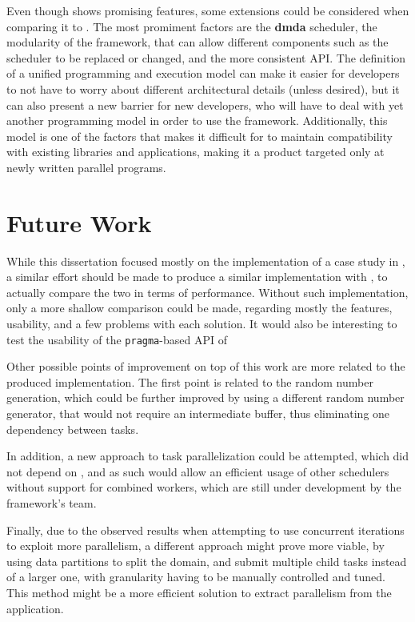 \documentclass[main.tex]{subfiles}
\begin{document}
Even though \gama shows promising features, some extensions could be considered when comparing it to \starpu. The most promiment factors are the \textbf{dmda} scheduler, the modularity of the framework, that can allow different components such as the scheduler to be replaced or changed, and the more consistent API. The definition of a unified programming and execution model can make it easier for developers to not have to worry about different architectural details (unless desired), but it can also present a new barrier for new developers, who will have to deal with yet another programming model in order to use the framework. Additionally, this model is one of the factors that makes it difficult for \gama to maintain compatibility with existing libraries and applications, making it a product targeted only at newly written parallel programs.


\section{Future Work} \label{chapter:future}

While this dissertation focused mostly on the implementation of a case study in \starpu, a similar effort should be made to produce a similar implementation with \gama, to actually compare the two in terms of performance. Without such implementation, only a more shallow comparison could be made, regarding mostly the features, usability, and a few problems with each solution.
It would also be interesting to test the usability of the \texttt{pragma}-based API of \starpu

Other possible points of improvement on top of this work are more related to the produced implementation. The first point is related to the random number generation, which could be further improved by using a different random number generator, that would not require an intermediate buffer, thus eliminating one dependency between tasks.

In addition, a new approach to task parallelization could be attempted, which did not depend on \openmp, and as such would allow an efficient usage of other \starpu schedulers without support for combined workers, which are still under development by the framework's team.

Finally, due to the observed results when attempting to use concurrent iterations to exploit more parallelism, a different approach might prove more viable, by using data partitions to split the domain, and submit multiple child tasks instead of a larger one, with granularity having to be manually controlled and tuned. This method might be a more efficient solution to extract parallelism from the application.
\end{document}
